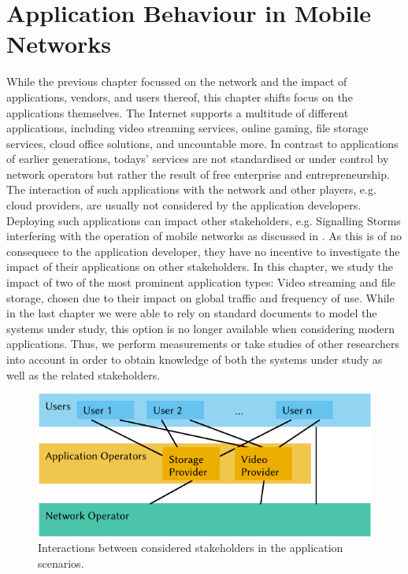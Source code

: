 \chapter{Application Behaviour in Mobile Networks}\label{chap:application}

\newcommand{\download}{Download\xspace}
\newcommand{\live}{Live\xspace}
\newcommand{\serviceprovisioning}{Provisioning\xspace}
\newcommand{\streaming}{Streaming\xspace}

While the previous chapter focussed on the network and the impact of applications, vendors, and users thereof, this chapter shifts focus on the applications themselves.
The Internet supports a multitude of different applications, including video streaming services, online gaming, file storage services, cloud office solutions, and uncountable more.
In contrast to applications of earlier generations, todays' services are not standardised or under control by network operators but rather the result of free enterprise and entrepreneurship.
The interaction of such applications with the network and other players, e.g. cloud providers, are usually not considered by the application developers.
Deploying such applications can impact other stakeholders, e.g. Signalling Storms interfering with the operation of mobile networks as discussed in .
As this is of no consequece to the application developer, they have no incentive to investigate the impact of their applications on other stakeholders.
In this chapter, we study the impact of two of the most prominent application types: Video streaming and file storage, chosen due to their impact on global traffic and frequency of use.
While in the last chapter we were able to rely on standard documents to model the systems under study, this option is no longer available when considering modern applications.
Thus, we perform measurements or take studies of other researchers into account in order to obtain knowledge of both the systems under study as well as the related stakeholders.

\begin{figure}
  \centering
  \includegraphics{application/figures/stakeholders}
  \caption{Interactions between considered stakeholders in the application scenarios.}
  \label{fig:application:stakeholders}
\end{figure}

